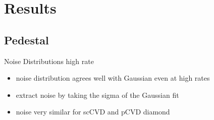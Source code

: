 \section{Results}
\subsection{Pedestal}
\begin{frame}{Noise Distributions \@ high rate}
 
	\vspace*{-15pt}

	\begin{itemize} \itemfill
		\item noise distribution agrees well with Gaussian even at high rates
		\item extract noise by taking the sigma of the Gaussian fit
		\item noise very similar for scCVD and pCVD diamond
	\end{itemize}
 
\end{frame}
